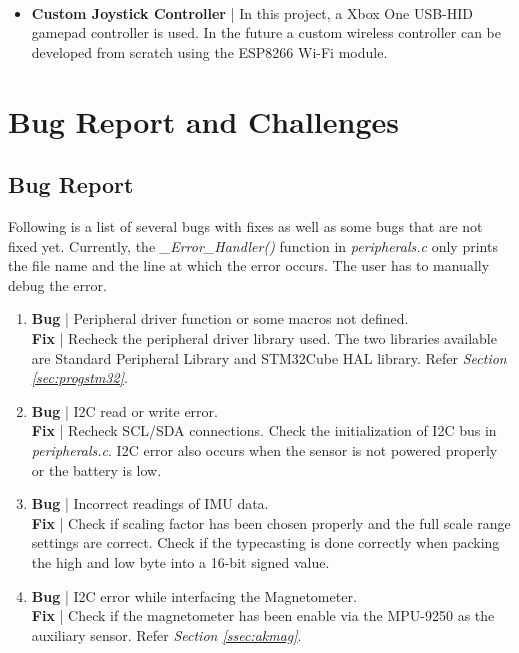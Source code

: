 \documentclass[a4paper,12pt,oneside]{book}
\begin{document}
{\begin{itemize}
\item \textbf{Custom Joystick Controller} | In this project, a Xbox\textsuperscript{\textregistered} One \cite{xbox} USB-HID gamepad controller is used. In the future a custom wireless controller can be developed from scratch using the ESP8266 Wi-Fi module.

\end{itemize}

\chapter[Bug Report and Challenges]{Bug Report and Challenges}
\section{Bug Report}
\label{sec:bugs}

Following is a list of several bugs with fixes as well as some bugs that are not fixed yet. Currently, the \textit{{\_}Error{\_}Handler()} function in \textit{peripherals.c} only prints the file name and the line at which the error occurs. The user has to manually debug the error.\\

\begin{enumerate}
\item \textbf{Bug} | Peripheral driver function or some macros not defined.\\
\textbf{Fix} | Recheck the peripheral driver library used. The two libraries available are Standard Peripheral Library and STM32Cube HAL library. Refer \textit{Section \ref{sec:progstm32}}.\\

\item \textbf{Bug} | I2C read or write error.\\
\textbf{Fix} | Recheck SCL/SDA connections. Check the initialization of I2C bus in \textit{peripherals.c}. I2C error also occurs when the sensor is not powered properly or the battery is low.\\

\item \textbf{Bug} | Incorrect readings of IMU data.\\
\textbf{Fix} | Check if scaling factor has been chosen properly and the full scale range settings are correct. Check if the typecasting is done correctly when packing the high and low byte into a 16-bit signed value.\\

\item \textbf{Bug} | I2C error while interfacing the Magnetometer.\\
\textbf{Fix} | Check if the magnetometer has been enable via the MPU-9250 as the auxiliary sensor. Refer \textit{Section \ref{ssec:akmag}}.\\


\end{enumerate}}
\end{document}
